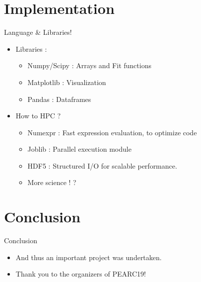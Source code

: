 \documentclass{beamer}
\begin{document}
\section{Implementation}
\begin{frame}{Language \& Libraries!}
	\begin{itemize}
		\item Libraries : 
		   \begin{itemize}
			\item Numpy/Scipy : Arrays and Fit functions
			\item Matplotlib : Visualization
			\item Pandas  : Dataframes
			\end{itemize}
		\item How to HPC ?
		   \begin{itemize}
			\item Numexpr : Fast expression evaluation, to optimize code
			\item Joblib : Parallel execution module
			\item HDF5 : Structured I/O for scalable performance.
			\item More science ! ?
			\end{itemize}
	\end{itemize}
\end{frame}


\section{Conclusion}
\begin{frame}{Conclusion}
	\begin{itemize}
		\item And thus an important project was undertaken.
		\item Thank you to the organizers of PEARC19! 
	\end{itemize}
\end{frame}


%
%
\end{document}

